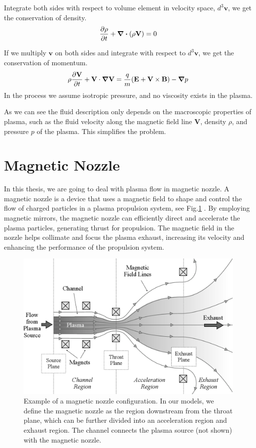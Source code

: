 Integrate both sides with respect to volume element in velocity space, $d^3\mathbf{v}$, we get the conservation of density.
\[ \pdv{\rho}{t} + \div(\rho\mathbf{V}) = 0 \]

If we multiply $\mathbf{v}$ on both sides and integrate with respect to $d^3\mathbf{v}$, we get the conservation of momentum.
\[ \rho\pdv{\mathbf{V}}{t} + \mathbf{V}\cdot\grad{\mathbf{V}} = \frac{q}{m}(\mathbf{E+V\times B}) - \grad{p} \]
In the process we assume isotropic pressure, and no viscosity exists in the plasma.

As we can see the fluid description only depends on the macroscopic properties of plasma, such as the fluid velocity along the magnetic field line $\mathbf{V}$, density $\rho$, and pressure $p$ of the plasma. This simplifies the problem.

\section{Magnetic Nozzle}
In this thesis, we are going to deal with plasma flow in magnetic nozzle.
A magnetic nozzle is a device that uses a magnetic field to shape and control the flow of charged particles in a plasma propulsion system, see Fig.\ref{fig:magnetic-nozzle} . By employing magnetic mirrors, the magnetic nozzle can efficiently direct and accelerate the plasma particles, generating thrust for propulsion. The magnetic field in the nozzle helps collimate and focus the plasma exhaust, increasing its velocity and enhancing the performance of the propulsion system.

\begin{figure}[htbp]
	\centering
	\includegraphics[width=0.7\linewidth]{img/introduction/magnetic-nozzle}
	\caption{Example of a magnetic nozzle configuration. In our models, we define the magnetic nozzle as the region downstream from the throat plane, which can be further divided into an acceleration region and exhaust region. The channel connects the plasma source (not shown) with the magnetic nozzle. \cite{little_performance_2015}}
	\label{fig:magnetic-nozzle}
\end{figure}

